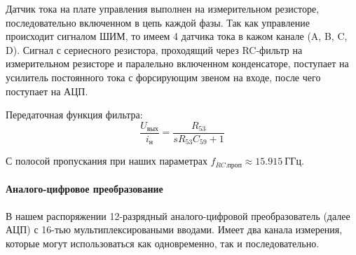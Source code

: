 Датчик тока на плате управления выполнен на измерительном резисторе, последовательно
включенном в цепь каждой фазы. Так как управление происходит сигналом ШИМ, то имеем 4
датчика тока в кажом канале (A, B, C, D).
Сигнал с сериесного резистора, проходящий через RC-фильтр на измерительном резисторе и паралельно включенном
конденсаторе, поступает на усилитель постоянного тока с форсирующим звеном на входе, после чего поступает на АЦП.

Передаточная функция фильтра:
$$
    \frac{ U_\text{вых} }{ i_\text{н} } = \frac{ R_{53} }{ s R_{53} C_{59} + 1 }
$$

С полосой пропускания при наших параметрах $f_{RC.\text{проп} } \approx 15.915 ~\text{ГГц}$.

\newpage
\paragraph{ Аналого-цифровое преобразование }
В нашем распоряжении 12-разрядный аналого-цифровой преобразователь (далее АЦП) с 16-тью
мультиплексироваными вводами.
Имеет два канала измерения, которые могут использоваться как одновременно, так и последовательно.

